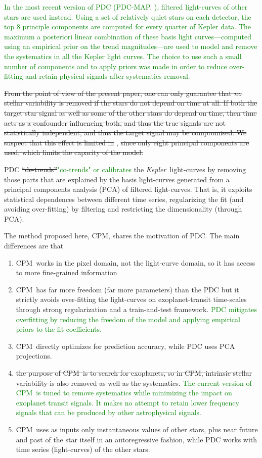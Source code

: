 \documentclass[12pt, preprint]{aastex}
\newcommand{\project}[1]{\textsl{#1}}
\newcommand{\Kepler}{\project{Kepler}}
\newcommand{\name}{CPM}
\newcommand{\revise}[1]{\textcolor{green}{#1}}
\newcommand{\remove}[1]{\sout{#1}}
\begin{document}
\revise{In the most recent version of PDC (PDC-MAP, \cite{pdc2,pdc3}), filtered light-curves of other stars are used
instead. Using a set of relatively quiet stars on each detector, the
top 8 principle components are computed for every quarter of Kepler
data. The maximum a posteriori linear combination of these basis light
curves---computed using an empirical prior on the trend
magnitudes---are used to model and remove the systematics in all the
Kepler light curves. The choice to use such a small number of
components and to apply priors was made in order to reduce
over-fitting and retain physical signals after systematics removal.}

\remove{From the point of view of the present paper, 
one can only guarantee that {\em no} stellar variability is removed if the stars do not depend on time at all.
If both the target star signal as well as some of the other stars do depend on time, 
  then time acts as a confounder influencing both, and thus the true signals are not statistically independent, 
  and thus the target signal may be compromised. 
We suspect that this effect is limited in} \cite{pdc2,pdc3}, 
  \remove{since only eight principal components are used, which limits the capacity of the model.}

PDC \remove{``de-trends''}\revise{"co-trends" or calibrates} the \Kepler\ light-curves by removing those parts that are explained by the basis light-curves
  generated from a principal components analysis (PCA) of filtered light-curves.
That is, it exploits statistical dependences between different time series, regularizing the fit (and avoiding over-fitting) 
  by filtering and restricting the dimensionality (through PCA).

The method proposed here, \name, shares the motivation of PDC.
The main differences are that
\begin{enumerate}
\item
\name\ works in the pixel domain, not the light-curve domain, so it has access to more fine-grained information
\item
\name\ has far more freedom (far more parameters) than the PDC
  but it strictly avoids over-fitting the light-curves on exoplanet-transit time-scales
  through strong regularization and a train-and-test framework. 
  \revise{PDC mitigates overfitting by
reducing the freedom of the model and applying empirical priors to the
fit coefficients.}
\item 
\name\ directly optimizes for prediction accuracy, while PDC uses PCA projections.
\item
\remove{the purpose of \name\ is to search for exoplanets, so in \name, intrinsic stellar
  variability is also removed as well as the systematics.}
  \revise{The current version of \name\ is
tuned to remove systematics while minimizing the impact on exoplanet
transit signals. It makes no attempt to retain lower frequency signals
that can be produced by other astrophysical signals.}
\item 
\name\ uses as inputs only instantaneous values of other stars, plus near future and past of the star itself in an autoregressive fashion, while PDC works with time series (light-curves) of the other stars.
\end{enumerate}
\end{document}
